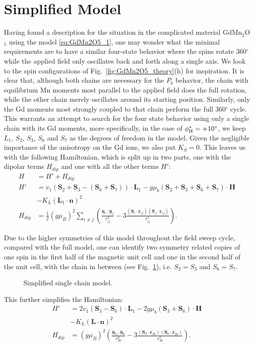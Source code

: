 \section{Simplified Model}
Having found a description for the situation in the complicated material GdMn$_2$O$_5$ using the model \ref{eq:GdMn2O5_1}, one may wonder what the minimal requirements are to have a similar four-state behavior where the spins rotate 360$^\circ$ while the applied field only oscillates back and forth along a single axis.
We look to the spin configurations of Fig.~\ref{fig:GdMn2O5_theory}(h) for inspiration.
It is clear that, although both chains are necessary for the $P_b$ behavior, the chain with equilibrium Mn moments most parallel to the applied field does the full rotation, while the other chain merely oscillates around its starting position.
Similarly, only the Gd moments most strongly coupled to that chain perform the full 360$^\circ$ cycle.
This warrants an attempt to search for the four state behavior using only a single chain with its Gd moments, more specifically, in the case of $\phi_{\rm H}^\ast = +10^\circ$, we keep $L_1$, $S_2$, $S_3$, $S_6$ and $S_7$ as the degrees of freedom in the model.
Given the negligible importance of the anisotropy on the Gd ions, we also put $K_S = 0$.
This leaves us with the following Hamiltonian, which is split up in two parts, one with the dipolar terms $H_{dip}$ and one with all the other terms $H'$:
\begin{align}
	H &= H' + H_{dip} \\
	H' &= v_1(\mathbf{S}_2 + \mathbf{S}_3 - (\mathbf{S}_6 + \mathbf{S}_7))\cdot\mathbf{L}_1 - g \mu_b (\mathbf{S}_2 + \mathbf{S}_3 + \mathbf{S}_6 + \mathbf{S}_7) \cdot \mathbf{H} \\
	&- K_L (\mathbf{L}_1 \cdot \mathbf{n})^2 \\
	H_{dip} &= \frac{1}{2}(g \mu_B)^2\sum_{i\neq j}\left(\frac{\mathbf{S}_i\cdot \mathbf{S}_j}{r_{ij}^3}-3\frac{(\mathbf{S}_i\cdot \mathbf{r}_{ij})(\mathbf{S}_j\cdot \mathbf{r}_{ij})}{r_{ij}^5}\right).
\end{align}

Due to the higher symmetries of this model throughout the field sweep cycle, compared with the full model, one can identify two symmetry related copies of one spin in the first half of the magnetic unit cell and one in the second half of the unit cell, with the chain in between (see Fig.~\ref{fig:GdMn2O5_simple_model}), i.e. $S_2 = S_3$ and $S_6 = S_7$.
\begin{figure}
	\caption{\label{fig:GdMn2O5_simple_model} Simplified single chain model.}
\end{figure}
This further simplifies the Hamiltonian:
\begin{align}
	H' &= 2v_1(\mathbf{S}_3 - \mathbf{S}_6)\cdot\mathbf{L}_1 - 2g \mu_b (\mathbf{S}_3 + \mathbf{S}_6) \cdot \mathbf{H} \\
	&- K_L (\mathbf{L} \cdot \mathbf{n})^2 \\
	H_{dip} &= (g \mu_B)^2\left(\frac{\mathbf{S}_3\cdot \mathbf{S}_6}{r_{36}^3}-3\frac{(\mathbf{S}_3\cdot \mathbf{r}_{36})(\mathbf{S}_6\cdot \mathbf{r}_{36})}{r_{36}^5}\right).
\end{align}

\printbibliography

